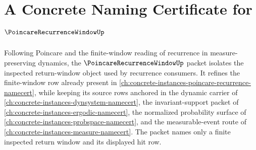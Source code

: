 \chapter{A Concrete Naming Certificate for $\PoincareRecurrenceWindowUp$}
\label{ch:concrete-instances-poincare-recurrence-window-namecert}

Following Poincare and the finite-window reading of recurrence in measure-preserving dynamics, the $\PoincareRecurrenceWindowUp$ packet isolates the inspected return-window object used by recurrence consumers. It refines the finite-window row already present in \autoref{ch:concrete-instances-poincare-recurrence-namecert}, while keeping its source rows anchored in the dynamic carrier of \autoref{ch:concrete-instances-dynsystem-namecert}, the invariant-support packet of \autoref{ch:concrete-instances-ergodic-namecert}, the normalized probability surface of \autoref{ch:concrete-instances-probspace-namecert}, and the measurable-event route of \autoref{ch:concrete-instances-measure-namecert}. The packet names only a finite inspected return window and its displayed hit row.


